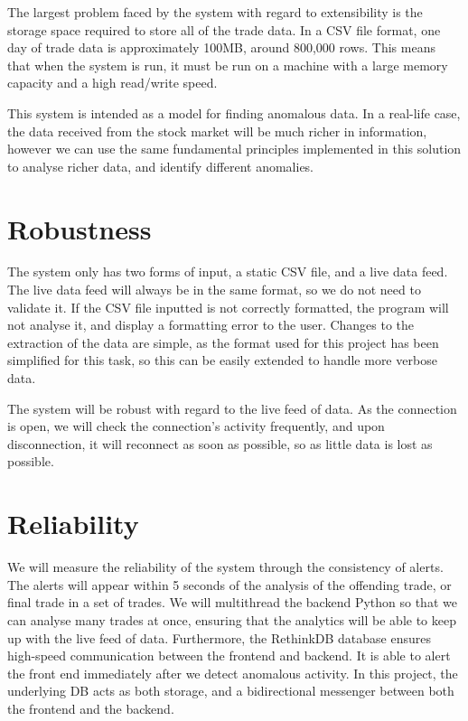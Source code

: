 \documentclass[11pt, oneside, a4paper]{article}
\begin{document}
The largest problem faced by the system with regard to extensibility is the storage
space required to store all of the trade data. In a CSV file format, one day of
trade data is approximately 100MB, around 800,000 rows. This means that when the
system is run, it must be run on a machine with a large memory capacity and a high
read/write speed.

This system is intended as a model for finding anomalous data. In a real-life case,
the data received from the stock market will be much richer in information, however
we can use the same fundamental principles implemented in this solution to analyse
richer data, and identify different anomalies.

\section{Robustness}
The system only has two forms of input, a static CSV file, and a live data feed.
The live data feed will always be in the same format, so we do not need to validate
it. If the CSV file inputted is not correctly formatted, the program will not analyse
it, and display a formatting error to the user. Changes to the extraction of the
data are simple, as the format used for this project has been simplified for this
task, so this can be easily extended to handle more verbose data.

The system will be robust with regard to the live feed of data. As the connection
is open, we will check the connection’s activity frequently, and upon disconnection,
it will reconnect as soon as possible, so as little data is lost as possible.

\section{Reliability}
We will measure the reliability of the system through the consistency of alerts.
The alerts will appear within 5 seconds of the analysis of the offending trade,
or final trade in a set of trades. We will multithread the backend Python so that
we can analyse many trades at once, ensuring that the analytics will be able
to keep up with the live feed of data. Furthermore, the RethinkDB database ensures
high-speed communication between the frontend and backend. It is able to alert the
front end immediately after we detect anomalous activity. In this project, the
underlying DB acts as both storage, and a bidirectional messenger between both the
frontend and the backend.
\end{document}
